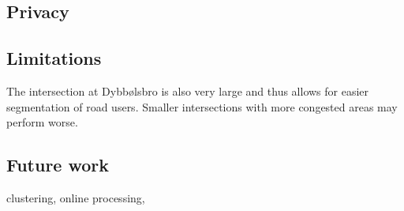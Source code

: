 \subsection{Privacy}


\subsection{Limitations}

The intersection at Dybbølsbro is also very large and thus allows for easier segmentation of road users. 
Smaller intersections with more congested areas may perform worse. 

\subsection{Future work}

clustering, online processing, 